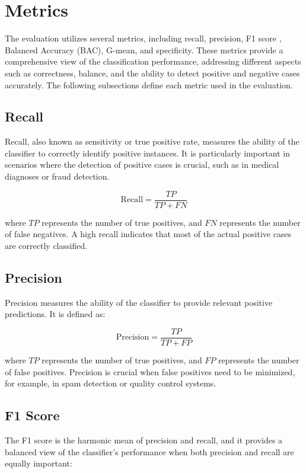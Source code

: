 \section{Metrics}
\label{sec:metrics}

The evaluation utilizes several metrics, including recall, precision, F1 score , Balanced Accuracy (BAC), G-mean, and specificity\cite{sasaki2007truth,kubat1997addressing, brodersen2010balanced}. These metrics provide a comprehensive view of the classification performance, addressing different aspects such as correctness, balance, and the ability to detect positive and negative cases accurately. The following subsections define each metric used in the evaluation.

\subsection{Recall}
Recall, also known as sensitivity or true positive rate, measures the ability of the classifier to correctly identify positive instances. It is particularly important in scenarios where the detection of positive cases is crucial, such as in medical diagnoses or fraud detection.

\begin{equation}
\text{Recall} = \frac{TP}{TP + FN}
\end{equation}

where $TP$ represents the number of true positives, and $FN$ represents the number of false negatives. A high recall indicates that most of the actual positive cases are correctly classified.

\subsection{Precision}
Precision measures the ability of the classifier to provide relevant positive predictions. It is defined as:

\begin{equation}
\text{Precision} = \frac{TP}{TP + FP}
\end{equation}

where $TP$ represents the number of true positives, and $FP$ represents the number of false positives. Precision is crucial when false positives need to be minimized, for example, in spam detection or quality control systems.

\subsection{F1 Score}
The F1 score is the harmonic mean of precision and recall, and it provides a balanced view of the classifier's performance when both precision and recall are equally important:

